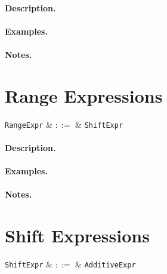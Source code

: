 \paragraph{Description.}

\paragraph{Examples.}

\paragraph{Notes.} 



\section{Range Expressions}

\begin{syntax}
  \verb+RangeExpr+ & $::=$ & \verb+ShiftExpr+\ \\
\end{syntax}

\paragraph{Description.}

\paragraph{Examples.}

\paragraph{Notes.} 


\section{Shift Expressions}

\begin{syntax}
  \verb+ShiftExpr+ & $::=$ & \verb+AdditiveExpr+\ 
\end{syntax}

